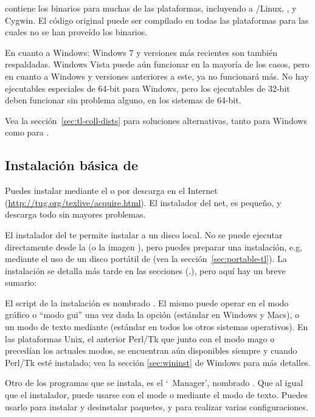 \documentclass{article}
\begin{document}
\TL{} contiene los binarios para muchas de las plataformas, incluyendo
a \GNU/Linux, \MacOSX, y Cygwin. El código original puede ser
compilado en todas las plataformas para las cuales no se han proveído
los binarios.

En cuanto a Windows: Windows 7 y versiones más recientes
son también respaldadas. Windows Vista puede aún funcionar en la mayoría de los casos, pero en cuanto a Windows  y versiones anteriores a este, \TL{} ya no funcionará más. No hay
ejecutables especiales de 64-bit para Windows, pero los ejecutables de
32-bit deben funcionar sin problema alguno, en los sistemas de
64-bit.

Vea la sección~\ref{sec:tl-coll-dists} para soluciones alternativas,
tanto para Windows como para \MacOSX.

\subsection{Instalación básica de \protect\TL{}}
\label{sec:basic}

Puedes instalar \TL{} mediante el \DVD{} o por descarga en el Internet
(\url{http://tug.org/texlive/acquire.html}). El instalador del net, es
pequeño, y descarga todo sin mayores problemas. 

El instalador del \DVD{} te permite instalar a un disco local. No se
puede ejecutar directamente \TL{} desde la \TK{} \DVD{} (o la
imagen ), pero puedes preparar una instalación, e.g,
mediante el uso de un disco portátil de \USB{} (vea la
sección~\ref{sec:portable-tl}). La instalación se detalla más tarde en
las secciones (\p.\pageref{sec:install}), pero aquí hay un breve
sumario:

\begin{itemize*}

\item El script de la instalación es nombrado . El mismo
	puede operar en el modo gráfico o ``modo gui'' una vez dada la opción
		 (estándar en Windows y Macs), o un modo de texto
		mediante  (estándar en todos los otros sistemas
		operativos). En las plataformas Unix, el anterior Perl/Tk que
		junto con el modo mago o  precedían los actuales
		modos, se encuentran aún disponibles siempre y cuando Perl/Tk
		esté instalado; vea la  sección \ref{sec:wininst} de Windows
		para más detalles. 

\item Otro de los programas que se instala, es el `\TL\ Manager', nombrado
	. Que al igual que el instalador, puede usarse con el mode
		\GUI{} o mediante el modo de texto. Puedes usarlo para instalar
		y desinstalar paquetes, y para realizar varias configuraciones.

\end{itemize*}
\end{document}
